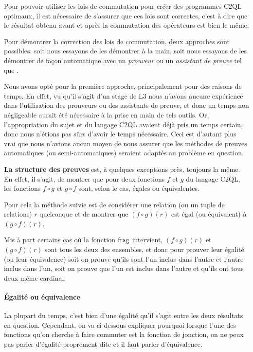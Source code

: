 Pour pouvoir utiliser les lois de commutation
pour créer des programmes C2QL optimaux,
il est nécessaire de s'assurer que ces lois sont correctes,
c'est à dire que le résultat obtenu avant et après la
commutation des opérateurs est bien le même.

Pour démontrer la correction des lois de commutation,
deux approches sont possibles:
soit nous essayons de les démontrer à la main,
soit nous essayons de les démontrer de façon automatique
avec un \emph{prouveur} ou un \emph{assistant de preuve}
tel que .

Nous avons opté pour la première approche,
principalement pour des raisons de temps.
En effet, vu qu'il s'agit d'un stage de L3
nous n'avons aucune expérience dans l'utilisation
des prouveurs ou des assistants de preuve,
et donc un temps non négligeable aurait été nécessaire
à la prise en main de tels outils.
Or, l'appropriation du sujet et du langage C2QL
avaient déjà pris un temps certain, donc
nous n'étions pas sûrs d'avoir le temps nécessaire.
Ceci est d'autant plus vrai que nous n'avions
aucun moyen de nous assurer que les méthodes 
de preuves automatiques (ou semi-automatiques) seraient
adaptés au problème en question.

\textbf{La structure des preuves} est,
à quelques exceptions près, toujours la même.
En effet, il s'agit, de montrer que pour deux fonctions
$f$ et $g$ du langage C2QL, les fonctions
$f \circ g$ et $g \circ f$ sont, selon le cas,
égales ou équivalentes.

Pour cela la méthode suivie est de considérer une relation
(ou un tuple de relations) $r$ quelconque et de montrer
que $(f \circ g) (r)$ est égal (ou équivalent)
à $(g \circ f) (r)$.

Mis à part certains cas où la fonction
$\operatorname{frag}$ intervient,
$(f \circ g) (r)$ et $(g \circ f) (r)$ sont tous les deux
des ensembles, et donc pour prouver leur égalité
(ou leur équivalence) soit on prouve qu'ils sont
l'un inclus dans l'autre et l'autre inclus dans l'un,
soit on prouve que l'un est inclus dans l'autre et qu'ils
ont tous deux même cardinal.

\paragraph{Égalité ou équivalence}
La plupart du temps, c'est bien d'une égalité qu'il s'agit
entre les deux résultats en question.
Cependant, on va ci-dessous expliquer pourquoi
lorsque l'une des fonctions qu'on cherche à faire commuter
est la fonction de jonction, on ne peux pas parler
d'égalité proprement dite et il faut parler d'équivalence.

